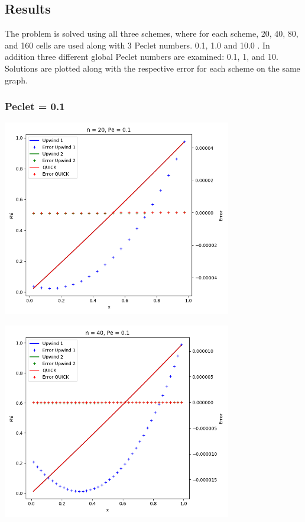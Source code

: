 \documentclass[11pt]{article}
\begin{document}
\subsection{Results}
\label{sec:org4d718f5}
The problem is solved using all three schemes, where for each scheme, 20, 40, 80, and 160 cells are used along with 3 Peclet numbers. 0.1, 1.0 and 10.0 . In addition three different global Peclet numbers are examined: 0.1, 1, and 10. 
Solutions are plotted along with the respective error for each scheme on the same graph. 
\newpage
\subsubsection{Peclet = 0.1}
\label{sec:org435ff03}
\begin{center}
\includegraphics[width=10cm]{./figures/n20pe01.png}
\end{center}

\begin{center}
\includegraphics[width=10cm]{./figures/n40pe01.png}
\end{center}
\end{document}
